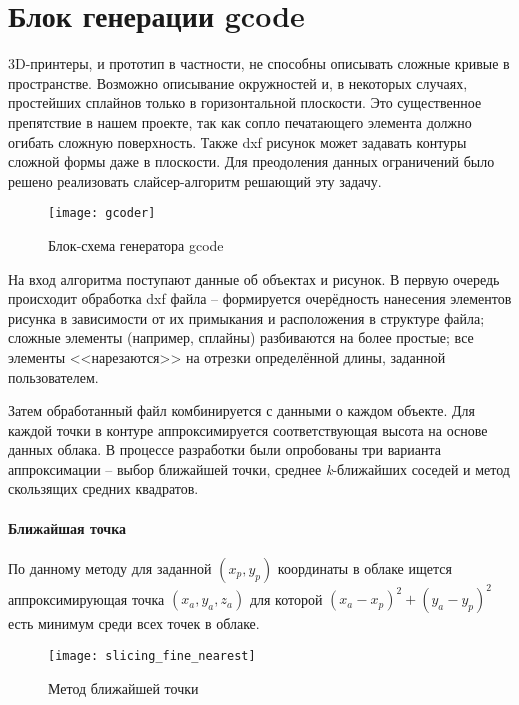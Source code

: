     \section{Блок генерации gcode}
        3D-принтеры, и прототип в частности, не способны описывать сложные кривые в пространстве. Возможно описывание окружностей и, в некоторых случаях, простейших сплайнов только в горизонтальной плоскости. Это существенное препятствие в нашем проекте, так как сопло печатающего элемента должно огибать сложную поверхность. Также dxf рисунок может задавать контуры сложной формы даже в плоскости. Для преодоления данных ограничений было решено реализовать слайсер-алгоритм решающий эту задачу.
        
        \begin{figure}[H]
            \centering
            \texttt{[image: gcoder]}
            \caption{Блок-схема генератора gcode}
            \label{pic:gcoder}
        \end{figure}
        
         На вход алгоритма поступают данные об объектах и рисунок. В первую очередь происходит обработка dxf файла -- формируется очерёдность нанесения элементов рисунка в зависимости от их примыкания и расположения в структуре файла; сложные элементы (например, сплайны) разбиваются на более простые; все элементы <<нарезаются>> на отрезки определённой длины, заданной пользователем.
         
         Затем обработанный файл комбинируется с данными о каждом объекте. Для каждой точки в контуре аппроксимируется соответствующая высота на основе данных облака. В процессе разработки были опробованы три варианта аппроксимации -- выбор ближайшей точки, среднее \textit{k}-ближайших соседей и метод скользящих средних квадратов.
         
         \paragraph{Ближайшая точка}
         По данному методу для заданной $ (x_p,y_p) $ координаты в облаке ищется аппроксимирующая точка $ (x_a, y_a, z_a) $ для которой $ (x_a-x_p)^2 + (y_a-y_p)^2 $ есть минимум среди всех точек в облаке.
         
         \begin{figure}[H]
             \centering
             \texttt{[image: slicing\_fine\_nearest]}
             \caption{Метод ближайшей точки}
             \label{pic:slicing_nearest}
         \end{figure}
         
